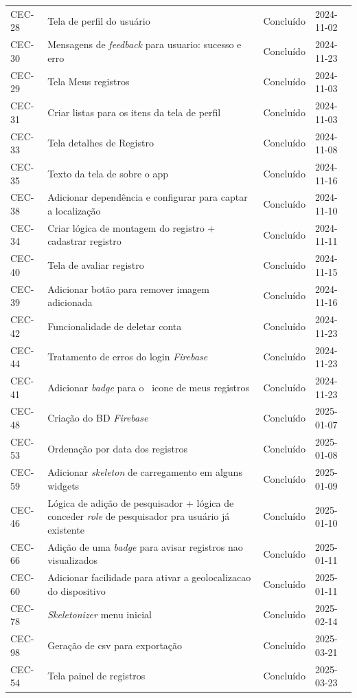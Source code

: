 \begin{longtable}{@{}lp{7cm}ll@{}}
CEC-28 & Tela de perfil do usuário & Concluído & 2024-11-02 \\
CEC-30 & Mensagens de \textit{feedback} para usuario: sucesso e erro & Concluído & 2024-11-23 \\ 
CEC-29 & Tela Meus registros & Concluído & 2024-11-03 \\
CEC-31 & Criar listas para os itens da tela de perfil & Concluído & 2024-11-03 \\
CEC-33 & Tela detalhes de Registro & Concluído & 2024-11-08 \\
CEC-35 & Texto da tela de sobre o app & Concluído & 2024-11-16 \\
CEC-38 & Adicionar dependência e configurar para captar a localização & Concluído & 2024-11-10 \\
CEC-34 & Criar lógica de montagem do registro + cadastrar registro & Concluído & 2024-11-11 \\
CEC-40 & Tela de avaliar registro & Concluído & 2024-11-15 \\
CEC-39 & Adicionar botão para remover imagem adicionada & Concluído & 2024-11-16 \\ 
CEC-42 & Funcionalidade de deletar conta & Concluído & 2024-11-23 \\
CEC-44 & Tratamento de erros do login \textit{Firebase} & Concluído & 2024-11-23 \\ 
CEC-41 & Adicionar \textit{badge} para o ~icone de meus registros & Concluído & 2024-11-23 \\ 
CEC-48 & Criação do BD \textit{Firebase} & Concluído & 2025-01-07 \\
CEC-53 & Ordenação por data dos registros & Concluído & 2025-01-08 \\
CEC-59 & Adicionar \textit{skeleton} de carregamento em alguns widgets & Concluído & 2025-01-09 \\
CEC-46 & Lógica de adição de pesquisador + lógica de conceder \textit{role} de pesquisador pra usuário já existente & Concluído & 2025-01-10 \\
CEC-66 & Adição de uma \textit{badge} para avisar registros nao visualizados & Concluído & 2025-01-11 \\
CEC-60 & Adicionar facilidade para ativar a geolocalizacao do dispositivo & Concluído & 2025-01-11 \\
CEC-78 & \textit{Skeletonizer} menu inicial & Concluído & 2025-02-14 \\
CEC-98 & Geração de csv para exportação & Concluído & 2025-03-21 \\
CEC-54 & Tela painel de registros & Concluído & 2025-03-23 \\

\end{longtable}
